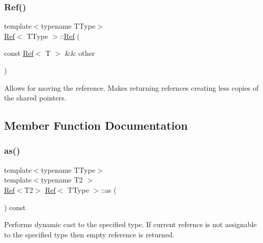 \mbox{\label{class_ref_a56886343e7faf21e18bec16042535cf5}} 
\subsubsection{\texorpdfstring{Ref()}{Ref()}\hspace{0.1cm}{\footnotesize\ttfamily [6/6]}}
{\footnotesize\ttfamily template$<$typename T\+Type$>$ \\
\mbox{\hyperlink{class_ref}{Ref}}$<$ T\+Type $>$\+::\mbox{\hyperlink{class_ref}{Ref}} (\begin{DoxyParamCaption}\item[{const \mbox{\hyperlink{class_ref}{Ref}}$<$ T $>$ \&\&}]{other }\end{DoxyParamCaption})\hspace{0.3cm}{\ttfamily [inline]}}



Allows for moving the reference. Makes returning refernces creating less copies of the shared pointers. 



\subsection{Member Function Documentation}
\mbox{\label{class_ref_a3debb396d13901075faf5bd1663ae9c6}} 
\subsubsection{\texorpdfstring{as()}{as()}}
{\footnotesize\ttfamily template$<$typename T\+Type$>$ \\
template$<$typename T2 $>$ \\
\mbox{\hyperlink{class_ref}{Ref}}$<$T2$>$ \mbox{\hyperlink{class_ref}{Ref}}$<$ T\+Type $>$\+::as (\begin{DoxyParamCaption}{ }\end{DoxyParamCaption}) const\hspace{0.3cm}{\ttfamily [inline]}}



Performs dynamic cast to the specified type. If current refernce is not assignable to the specified type then empty reference is returned. 

